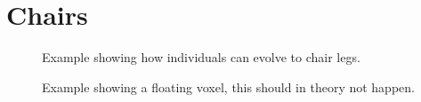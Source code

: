 \section{Chairs}
\begin{figure}[h]
\centering
{}
\hfil
{}
\caption{Example showing how individuals can evolve to chair legs.}
\label{fig:chair:legs}
\end{figure}

\begin{figure}[h]
\centering
{}
\caption{Example showing a floating voxel, this should in theory not happen.}
\label{fig:chair:floatvox}
\end{figure}
